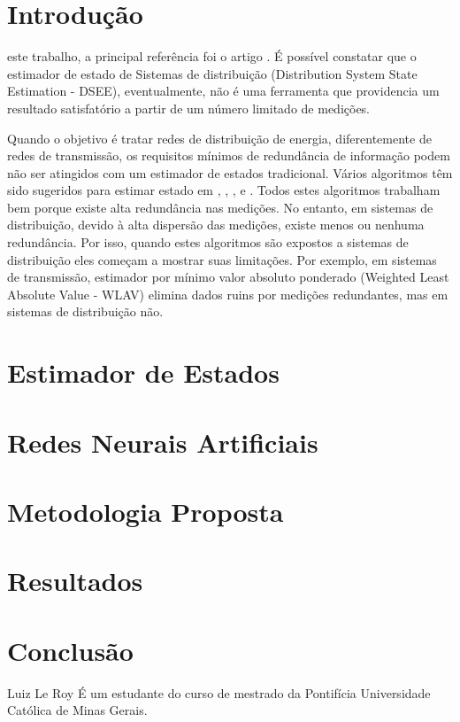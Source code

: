 \documentclass{IEEEtran}
\begin{document}
\IEEEpeerreviewmaketitle

\section{Introdução}
 este trabalho, a principal referência foi o artigo \cite{manitsas2012distribution}. É possível constatar que o estimador de estado de Sistemas de distribuição (Distribution System State Estimation - DSEE), eventualmente, não é uma ferramenta que providencia um resultado satisfatório a partir de um número limitado de medições. 

Quando o objetivo é tratar redes de distribuição de energia, diferentemente de redes de transmissão, os requisitos mínimos de redundância de informação podem não ser atingidos com um estimador de estados tradicional. Vários algoritmos têm sido sugeridos para estimar estado em \cite{schweppe1970powerI}, \cite{schweppe1970powerII}, \cite{schweppe1970powerIII}, \cite{abur2004power} e \cite{monticelli2000electric}. Todos estes algoritmos trabalham bem porque existe alta redundância nas medições. No entanto, em sistemas de distribuição, devido à alta dispersão das medições, existe menos ou nenhuma redundância. Por isso, quando estes algoritmos são expostos a sistemas de distribuição eles começam a mostrar suas limitações. Por exemplo, em sistemas de transmissão, estimador por mínimo valor absoluto ponderado (Weighted Least Absolute Value - WLAV) elimina dados ruins por medições redundantes, mas em sistemas de distribuição não. 

\section{Estimador de Estados}

\section{Redes Neurais Artificiais}

\section{Metodologia Proposta}

\section{Resultados}

\section{Conclusão}


\ifCLASSOPTIONcaptionsoff
  \newpage
\fi




\begin{IEEEbiographynophoto}{Luiz Le Roy}
\'E um estudante do curso de mestrado da Pontif\'icia Universidade Cat\'olica de Minas Gerais.
\end{IEEEbiographynophoto}

\end{document}
